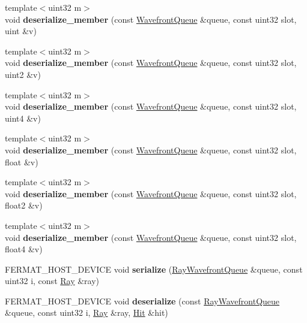 \begin{DoxyCompactItemize}
{\footnotesize template$<$uint32 m$>$ }\\void {\bfseries deserialize\+\_\+member} (const \hyperlink{struct_wavefront_queue}{Wavefront\+Queue} \&queue, const uint32 slot, uint \&v)
\item 
\mbox{\label{group___wavefront_queues_ga347f8e5846006182c80b94f907319b1b}} 
{\footnotesize template$<$uint32 m$>$ }\\void {\bfseries deserialize\+\_\+member} (const \hyperlink{struct_wavefront_queue}{Wavefront\+Queue} \&queue, const uint32 slot, uint2 \&v)
\item 
\mbox{\label{group___wavefront_queues_ga38979bf967d4bbe05b74d0e271ae1c43}} 
{\footnotesize template$<$uint32 m$>$ }\\void {\bfseries deserialize\+\_\+member} (const \hyperlink{struct_wavefront_queue}{Wavefront\+Queue} \&queue, const uint32 slot, uint4 \&v)
\item 
\mbox{\label{group___wavefront_queues_ga4ba0c25e3729708a64b76ca924be3300}} 
{\footnotesize template$<$uint32 m$>$ }\\void {\bfseries deserialize\+\_\+member} (const \hyperlink{struct_wavefront_queue}{Wavefront\+Queue} \&queue, const uint32 slot, float \&v)
\item 
\mbox{\label{group___wavefront_queues_ga5bac7d97bb6279cfc5ee704973fd3699}} 
{\footnotesize template$<$uint32 m$>$ }\\void {\bfseries deserialize\+\_\+member} (const \hyperlink{struct_wavefront_queue}{Wavefront\+Queue} \&queue, const uint32 slot, float2 \&v)
\item 
\mbox{\label{group___wavefront_queues_gaf0578643fefee0dacbdaaca6ce4226a5}} 
{\footnotesize template$<$uint32 m$>$ }\\void {\bfseries deserialize\+\_\+member} (const \hyperlink{struct_wavefront_queue}{Wavefront\+Queue} \&queue, const uint32 slot, float4 \&v)
\item 
\mbox{\label{group___wavefront_queues_ga1aab46bdcf04f6525ee2fdfbbaa41325}} 
F\+E\+R\+M\+A\+T\+\_\+\+H\+O\+S\+T\+\_\+\+D\+E\+V\+I\+CE void {\bfseries serialize} (\hyperlink{struct_ray_wavefront_queue}{Ray\+Wavefront\+Queue} \&queue, const uint32 i, const \hyperlink{struct_ray}{Ray} \&ray)
\item 
\mbox{\label{group___wavefront_queues_gaf0ca5270d5e10dc216194cc252bbc9ba}} 
F\+E\+R\+M\+A\+T\+\_\+\+H\+O\+S\+T\+\_\+\+D\+E\+V\+I\+CE void {\bfseries deserialize} (const \hyperlink{struct_ray_wavefront_queue}{Ray\+Wavefront\+Queue} \&queue, const uint32 i, \hyperlink{struct_ray}{Ray} \&ray, \hyperlink{struct_hit}{Hit} \&hit)
\end{DoxyCompactItemize}
